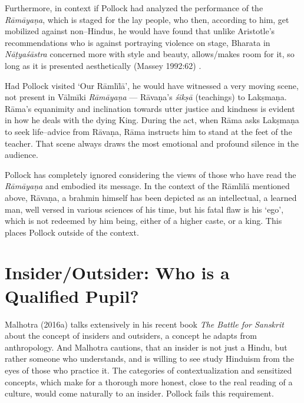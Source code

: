 Furthermore, in context if Pollock had analyzed the performance of the \textit{Rāmāyaṇa}, which is staged for the lay people, who then, according to him, get mobilized against non–Hindus, he would have found that unlike Aristotle’s recommendations who is against portraying violence on stage, Bharata in \textit{Nāṭyaśāstra} concerned more with style and beauty, allows/makes room for it, so long as it is presented aesthetically (Massey 1992:62) .

Had Pollock visited ‘Our Rāmlīlā’, he would have witnessed a very moving scene, not present in Vālmīki \textit{Rāmāyaṇa} — Rāvaṇa’s \textit{śikṣā} (teachings) to Lakṣmaṇa. Rāma’s equanimity and inclination towards utter justice and kindness is evident in how he deals with the dying King. During the act, when Rāma asks Lakṣmaṇa to seek life–advice from Rāvaṇa, Rāma instructs him to stand at the feet of the teacher. That scene always draws the most emotional and profound silence in the audience.

Pollock has completely ignored considering the views of those who have read the \textit{Rāmāyaṇa} and embodied its message. In the context of the Rāmlīlā mentioned above, Rāvaṇa, a brahmin himself has been depicted as an intellectual, a learned man, well versed in various sciences of his time, but his fatal flaw is his ‘ego’, which is not redeemed by him being, either of a higher caste, or a king. This places Pollock outside of the context.


\section*{Insider/Outsider: Who is a Qualified Pupil?}

Malhotra (2016a) talks extensively in his recent book \textit{The Battle for Sanskrit} about the concept of insiders and outsiders, a concept he adapts from anthropology. And Malhotra cautions, that an insider is not just a Hindu, but rather someone who understands, and is willing to see study Hinduism from the eyes of those who practice it. The categories of contextualization and sensitized concepts, which make for a thorough more honest, close to the real reading of a culture, would come naturally to an insider. Pollock fails this requirement.

